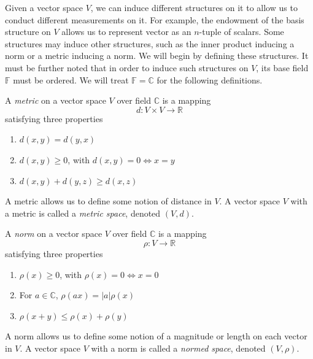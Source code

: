 \documentclass{article}
\begin{document}
  Given a vector space $V$, we can induce different structures on it to allow us to conduct different measurements on it. For example, the endowment of the basis structure on $V$ allows us to represent vector as an $n$-tuple of scalars. Some structures may induce other structures, such as the inner product inducing a norm or a metric inducing a norm. We will begin by defining these structures. It must be further noted that in order to induce such structures on $V$, its base field $\mathbb{F}$ must be ordered. We will treat $\mathbb{F} = \mathbb{C}$ for the following definitions. 

  \begin{definition}[Metric]
    A \textit{metric} on a vector space $V$ over field $\mathbb{C}$ is a mapping
    \begin{equation}
      d: V \times V \longrightarrow \mathbb{R}
    \end{equation}
    satisfying three properties 
    \begin{enumerate}
      \item $d(x, y) = d(y, x)$
      \item $d(x, y) \geq 0$, with $d(x,y) = 0 \iff x=y$
      \item $d(x, y) + d(y,z) \geq d(x,z)$
    \end{enumerate}
    A metric allows us to define some notion of distance in $V$. A vector space $V$ with a metric is called a \textit{metric space}, denoted $(V, d)$. 
  \end{definition}

  \begin{definition}[Norm]
    A \textit{norm} on a vector space $V$ over field $\mathbb{C}$ is a mapping 
    \begin{equation}
      \rho: V \longrightarrow \mathbb{R}
    \end{equation}
    satisfying three properties 
    \begin{enumerate}
      \item $\rho (x) \geq 0$, with $\rho(x) = 0 \iff x = 0$
      \item For $a \in \mathbb{C}$, $\rho (a x) = |a| \rho(x)$ 
      \item $\rho(x + y) \leq \rho(x) + \rho(y)$ 
    \end{enumerate}
    A norm allows us to define some notion of a magnitude or length on each vector in $V$. A vector space $V$ with a norm is called a \textit{normed space}, denoted $(V, \rho)$. 
  \end{definition}
\end{document}
